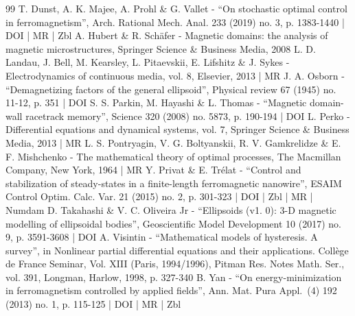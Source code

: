 \documentclass[10pt]{amsart}
\theoremstyle{definition}
\begin{document}
\begin{thebibliography}{99}
T. Dunst, A. K. Majee, A. Prohl \& G. Vallet - “On stochastic optimal control in ferromagnetism”, Arch. Rational Mech. Anal. 233 (2019) no. 3, p. 1383-1440 | DOI | MR | Zbl
A. Hubert \& R. Schäfer - Magnetic domains: the analysis of magnetic microstructures, Springer Science \& Business Media, 2008
L. D. Landau, J. Bell, M. Kearsley, L. Pitaevskii, E. Lifshitz \& J. Sykes - Electrodynamics of continuous media, vol. 8, Elsevier, 2013 | MR
J. A. Osborn - “Demagnetizing factors of the general ellipsoid”, Physical review 67 (1945) no. 11-12, p. 351 | DOI
S. S. Parkin, M. Hayashi \& L. Thomas - “Magnetic domain-wall racetrack memory”, Science 320 (2008) no. 5873, p. 190-194 | DOI
L. Perko - Differential equations and dynamical systems, vol. 7, Springer Science \& Business Media, 2013 | MR
L. S. Pontryagin, V. G. Boltyanskii, R. V. Gamkrelidze \& E. F. Mishchenko - The mathematical theory of optimal processes, The Macmillan Company, New York, 1964 | MR
Y. Privat \& E. Trélat - “Control and stabilization of steady-states in a finite-length ferromagnetic nanowire”, ESAIM Control Optim. Calc. Var. 21 (2015) no. 2, p. 301-323 | DOI | Zbl | MR | Numdam
D. Takahashi \& V. C. Oliveira Jr - “Ellipsoids (v1. 0): 3-D magnetic modelling of ellipsoidal bodies”, Geoscientific Model Development 10 (2017) no. 9, p. 3591-3608 | DOI
A. Visintin - “Mathematical models of hysteresis. A survey”, in Nonlinear partial differential equations and their applications. Collège de France Seminar, Vol. XIII (Paris, 1994/1996), Pitman Res. Notes Math. Ser., vol. 391, Longman, Harlow, 1998, p. 327-340
B. Yan - “On energy-minimization in ferromagnetism controlled by applied fields”, Ann. Mat. Pura Appl. (4) 192 (2013) no. 1, p. 115-125 | DOI | MR | Zbl
\end{thebibliography}
\end{document}
